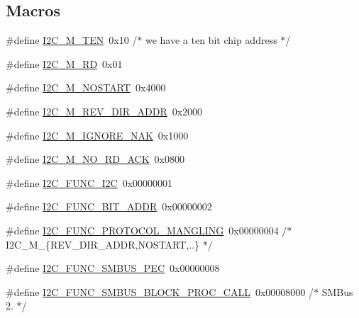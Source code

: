 \subsection*{Macros}
\begin{DoxyCompactItemize}
\item 
\#define \hyperlink{smbus-cffi-0_83_82_2include_2linux_2i2c-dev_8h_abe53ff15e0717ccbd1d4c656c09ee53a}{I2\+C\+\_\+\+M\+\_\+\+T\+E\+N}~0x10	/$\ast$ we have a ten bit chip address	$\ast$/
\item 
\#define \hyperlink{smbus-cffi-0_83_82_2include_2linux_2i2c-dev_8h_adb8eddbb89e88c4fc0e44306fc878b85}{I2\+C\+\_\+\+M\+\_\+\+R\+D}~0x01
\item 
\#define \hyperlink{smbus-cffi-0_83_82_2include_2linux_2i2c-dev_8h_a7a467d37a113d97496f0fa69c6c15650}{I2\+C\+\_\+\+M\+\_\+\+N\+O\+S\+T\+A\+R\+T}~0x4000
\item 
\#define \hyperlink{smbus-cffi-0_83_82_2include_2linux_2i2c-dev_8h_a6392dd65e4022a3ed20fc2d7dca3392f}{I2\+C\+\_\+\+M\+\_\+\+R\+E\+V\+\_\+\+D\+I\+R\+\_\+\+A\+D\+D\+R}~0x2000
\item 
\#define \hyperlink{smbus-cffi-0_83_82_2include_2linux_2i2c-dev_8h_a0629c50bb05b4c037e726373da50755b}{I2\+C\+\_\+\+M\+\_\+\+I\+G\+N\+O\+R\+E\+\_\+\+N\+A\+K}~0x1000
\item 
\#define \hyperlink{smbus-cffi-0_83_82_2include_2linux_2i2c-dev_8h_adb8351c5c02ca2b6909baa9d374ff6d4}{I2\+C\+\_\+\+M\+\_\+\+N\+O\+\_\+\+R\+D\+\_\+\+A\+C\+K}~0x0800
\item 
\#define \hyperlink{smbus-cffi-0_83_82_2include_2linux_2i2c-dev_8h_a57a8a5a73f12268825d31bec6184b915}{I2\+C\+\_\+\+F\+U\+N\+C\+\_\+\+I2\+C}~0x00000001
\item 
\#define \hyperlink{smbus-cffi-0_83_82_2include_2linux_2i2c-dev_8h_a41ba50f5508feed338fe3181540e1894}{I2\+C\+\_\+\+F\+U\+N\+C\+\_\+B\+I\+T\+\_\+\+A\+D\+D\+R}~0x00000002
\item 
\#define \hyperlink{smbus-cffi-0_83_82_2include_2linux_2i2c-dev_8h_af023c6b90cc950f3673e98462ff52a59}{I2\+C\+\_\+\+F\+U\+N\+C\+\_\+\+P\+R\+O\+T\+O\+C\+O\+L\+\_\+\+M\+A\+N\+G\+L\+I\+N\+G}~0x00000004 /$\ast$ I2\+C\+\_\+\+M\+\_\+\{\+R\+E\+V\+\_\+\+D\+I\+R\+\_\+\+A\+D\+D\+R,\+N\+O\+S\+T\+A\+R\+T,..\} $\ast$/
\item 
\#define \hyperlink{smbus-cffi-0_83_82_2include_2linux_2i2c-dev_8h_aef3b905e021dbe7aaf98da89c4648764}{I2\+C\+\_\+\+F\+U\+N\+C\+\_\+\+S\+M\+B\+U\+S\+\_\+\+P\+E\+C}~0x00000008
\item 
\#define \hyperlink{smbus-cffi-0_83_82_2include_2linux_2i2c-dev_8h_ab98217e0ad04cb3068e159c2de8fd84d}{I2\+C\+\_\+\+F\+U\+N\+C\+\_\+\+S\+M\+B\+U\+S\+\_\+\+B\+L\+O\+C\+K\+\_\+\+P\+R\+O\+C\+\_\+\+C\+A\+L\+L}~0x00008000 /$\ast$ S\+M\+Bus 2. $\ast$/

\end{DoxyCompactItemize}
